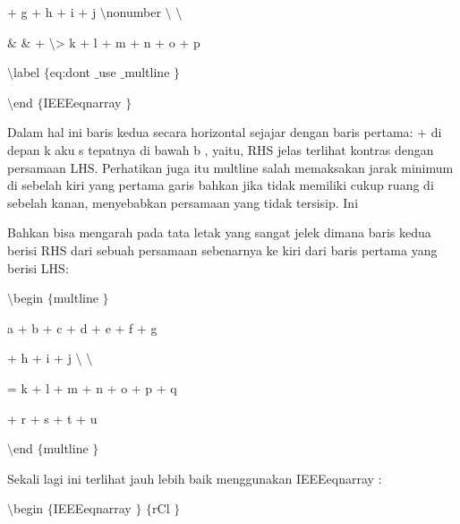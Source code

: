 \noindent 
+ g + h + i + j  $  \setminus  $nonumber $  \setminus  $ $  \setminus  $ \par
\vspace{12pt}
\noindent 
 $  \&  $ $  \&  $ + $  \setminus  $> k + l + m + n + o + p \par
\vspace{12pt}
\noindent 
 $  \setminus  $label $  \{  $eq:dont $  \_  $use $  \_  $multline $  \}  $ \par
\vspace{12pt}
\noindent 
 $  \setminus  $end $  \{  $IEEEeqnarray $  \}  $ \par
\vspace{12pt}
\noindent 
 \hspace*{0.5in} Dalam hal ini baris kedua secara horizontal sejajar dengan baris pertama: + di depan k aku s tepatnya di bawah b , yaitu, RHS jelas terlihat kontras dengan persamaan LHS. Perhatikan juga itu multline salah memaksakan jarak minimum di sebelah kiri yang pertama garis bahkan jika tidak memiliki cukup ruang di sebelah kanan, menyebabkan persamaan yang tidak tersisip. Ini \par
\noindent 
Bahkan bisa mengarah pada tata letak yang sangat jelek dimana baris kedua berisi RHS dari sebuah persamaan sebenarnya ke kiri dari baris pertama yang berisi LHS: \par
\noindent 
 $  \setminus  $begin $  \{  $multline $  \}  $ \par
\vspace{12pt}
\noindent 
a + b + c + d + e + f + g \par
\vspace{12pt}
\noindent 
+ h + i + j  $  \setminus  $ $  \setminus  $ \par
\vspace{12pt}
\noindent 
= k + l + m + n + o + p + q \par
\vspace{12pt}
\noindent 
+ r + s + t + u \par
\vspace{12pt}
\noindent 
 $  \setminus  $end $  \{  $multline $  \}  $ \par
\noindent 
\vspace{16pt}
\noindent 
Sekali lagi ini terlihat jauh lebih baik menggunakan IEEEeqnarray : \par
\vspace{12pt}
\noindent 
 $  \setminus  $begin $  \{  $IEEEeqnarray $  \}  $ $  \{  $rCl $  \}  $ \par
\vspace{12pt}
